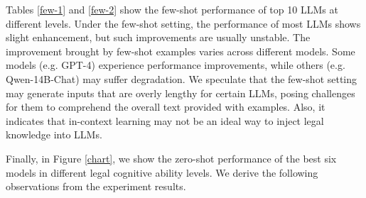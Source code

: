 Tables \ref{few-1} and \ref{few-2} show the few-shot performance of top 10 LLMs at different levels. Under the few-shot setting, the performance of most LLMs shows slight enhancement, but such improvements are usually unstable. 
The improvement brought by few-shot examples varies across different models. Some models (e.g. GPT-4) experience performance improvements, while others (e.g. Qwen-14B-Chat) may suffer degradation.
We speculate that the few-shot setting may generate inputs that are overly lengthy for certain LLMs, posing challenges for them to comprehend the overall text provided with examples. Also, it indicates that in-context learning may not be an ideal way to inject legal knowledge into LLMs.

Finally, in Figure \ref{chart}, we show the zero-shot performance of the best six models in different legal cognitive ability levels. We derive the following observations from the experiment results.

